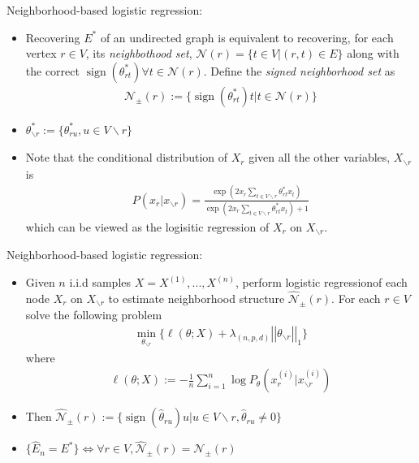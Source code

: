 \documentclass[xcolor=dvipsnames,aspectratio=1610]{beamer}
\newcommand{\norm}[1]{\left|\left|#1\right|\right|}
\DeclareMathOperator*{\sign}{sign}
\theoremstyle{remark}
\begin{document}
\begin{frame}{Neighborhood-based logistic regression:}
  \begin{itemize}
    \setlength{\itemsep}{10pt}
\item Recovering $E^*$ of an undirected graph is equivalent to recovering, for each vertex $r \in V$, its \textit{neighbothood set}, $\mathcal{N}(r) = \{t \in V | (r,t) \in E\}$ along with the correct $\sign(\theta^*_{rt}) \forall t \in \mathcal{N}(r)$. Define the \textit{signed neighborhood set} as 
\begin{align*}
\mathcal{N}_{\pm}(r) := \{\sign(\theta^*_{rt})t | t \in \mathcal{N}(r)\}
\end{align*}
\item $\theta^*_{\backslash r} := \{\theta^*_{ru}, u \in V \backslash r\}$
\item Note that the conditional distribution of $X_r$ given all the other variables, $X_{\backslash r}$ is 
\begin{align*}
P(x_r|x_{\backslash r}) = \frac{\exp(2x_r \sum_{t \in V \backslash r} \theta^*_{rt} x_t )}{\exp(2x_r \sum_{t \in V \backslash r } \theta^*_{rt} x_t ) + 1}
\end{align*}
which can be viewed as the logisitic regression of $X_r$ on $X_{\backslash r}$.
  \end{itemize}
\end{frame}

\begin{frame}{Neighborhood-based logistic regression:}
  \begin{itemize}
    \setlength{\itemsep}{10pt}
\item Given $n$ i.i.d samples $X = X^{(1)},...,X^{(n)}$, perform logistic regressionof each node $X_r$ on $X_{\backslash r}$ to estimate neighborhood structure $\hat{\mathcal{N}}_{\pm} (r).$ For each $r \in V$ solve the following problem
\begin{align} \label{eq:logis}
\min_{\theta_{\backslash r}} \{\ell(\theta;X) + \lambda_{(n,p,d)} \norm{\theta_{\backslash r}}_1\}
\end{align}
where 
\begin{align*}
\ell(\theta;X) := - \frac{1}{n} \sum_{i=1}^n \log P_\theta(x^{(i)}_r | x^{(i)}_{\backslash r})
\end{align*}
\item Then $\hat{\mathcal{N}}_{\pm}(r):= \{\sign(\hat{\theta}_{ru})u | u \in V \backslash r, \hat{\theta}_{ru} \neq 0 \}$ 
\item $\{\hat{E}_n = E^*\} \iff \forall r \in V, \hat{\mathcal{N}}_{\pm}(r) = {\mathcal{N}}_{\pm}(r)$
  \end{itemize}
\end{frame}
\end{document}
